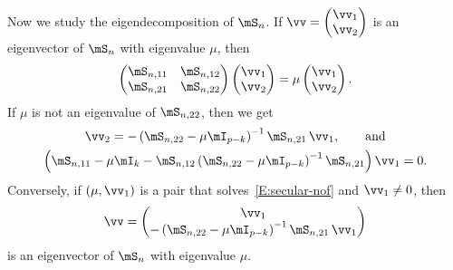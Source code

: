 Now we study the eigendecomposition of $\mS_n$.  If 
\(
    \vv
    = 
    \left( 
    \begin{matrix}
        \vv_{1} \\
        \vv_{2}
    \end{matrix}
    \right)
\)
is an eigenvector of $\mS_n$ with eigenvalue $\mu$, then
\[
    \left(
    \begin{matrix}
        \mS_{n,11} & \mS_{n,12} \\
        \mS_{n,21} & \mS_{n,22}
    \end{matrix}
    \right)
    \left( 
    \begin{matrix}
        \vv_{1} \\
        \vv_{2}
    \end{matrix}
    \right)
    =
    \mu
    \left( 
    \begin{matrix}
        \vv_{1} \\
        \vv_{2}
    \end{matrix}
    \right).
\]
If $\mu$ is not an eigenvalue of $\mS_{n,22}$, then we get
\begin{subequations}
\begin{gather}\label{E:v2-from-v1}
    \vv_2
    =
    -
    \left(
        \mS_{n,22}
        -
        \mu
        \mI_{p-k}
    \right)^{-1}
    \mS_{n,21} \,
    \vv_1, \qquad\text{and} \\
    \label{E:secular-nof}
    \left(
        \mS_{n,11}
        -
        \mu
        \mI_k
        -
        \mS_{n,12}
        \left(
            \mS_{n,22}
            -
            \mu
            \mI_{p-k}
        \right)^{-1}
        \mS_{n,21}
    \right)
    \vv_1
    =
    0.
\end{gather}
\end{subequations}
Conversely, if $(\mu, \vv_1)$ is a pair that solves~\eqref{E:secular-nof}
and $\vv_1 \neq 0$, then
\begin{equation}\label{E:v-from-v1}
    \vv
    =
    \left(
    \begin{matrix}
        \vv_1 \\
        -
        \left(
            \mS_{n,22}
            -
            \mu
            \mI_{p-k}
        \right)^{-1}
        \mS_{n,21} \,
        \vv_1
    \end{matrix}
    \right)
\end{equation}
is an eigenvector of $\mS_n$ with eigenvalue $\mu$.  

